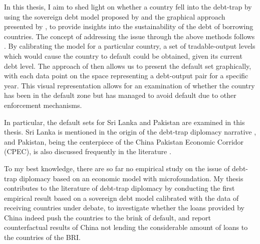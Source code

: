 In this thesis, I aim to shed light on whether a country fell into the debt-trap by using the sovereign debt model proposed by \citet{Na-18} and the graphical approach presented by \citet{Hinrichsen_2020-chapter4}, to provide insights into the sustainability of the debt of borrowing countries.
The concept of addressing the issue through the above methods follows \citet{Ho-23-debt-trap}.
By calibrating the model for a particular country, a set of tradable-output levels which would cause the country to default could be obtained, given its current debt level. The approach of \citet{Hinrichsen_2020-chapter4} then allows us to present the default set graphically, with each data point on the space representing a debt-output pair for a specific year. This visual representation allows for an examination of whether the country has been in the default zone but has managed to avoid default due to other enforcement mechanisms.

In particular, the default sets for Sri Lanka and Pakistan are examined in this thesis. Sri Lanka is mentioned in the origin of the debt-trap diplomacy narrative \citep{Chellaney_2017}, and Pakistan, being the centerpiece of the China Pakistan Economic Corridor (CPEC), is also discussed frequently in the literature \citep{Hurley19-8-debt-trap}.

To my best knowledge, there are so far no empirical study on the issue of debt-trap diplomacy based on an economic model with microfoundation. My thesis contributes to the literature of debt-trap diplomacy by conducting the first empirical result based on a sovereign debt model calibrated with the data of receiving countries under debate, to investigate whether the loans provided by China indeed push the countries to the brink of default, and report counterfactual results of China not lending the considerable amount of loans to the countries of the BRI.

